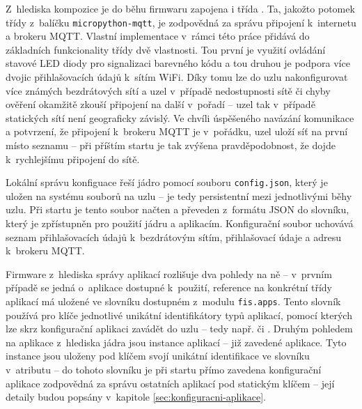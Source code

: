 Z~hlediska kompozice je do běhu firmwaru zapojena i třída . Ta, jakožto potomek třídy 
z~balíčku \texttt{micropython-mqtt}, je zodpovědná za správu připojení k~internetu a brokeru MQTT.
Vlastní implementace v~rámci této práce přidává do základních funkcionality třídy dvě vlastnosti.
Tou první je využití ovládání stavové LED diody pro signalizaci barevného kódu a tou druhou je podpora více dvojic
přihlašovacích údajů k~sítím WiFi. Díky tomu lze do uzlu nakonfigurovat více známých bezdrátových sítí a uzel
v~případě nedostupnosti sítě či chyby ověření okamžitě zkouší připojení na další v~pořadí -- uzel tak v~případě
statických sítí není geograficky závislý. Ve chvíli úspěšeného navázání komunikace a potvrzení, že připojení
k~brokeru MQTT je v~pořádku, uzel uloží síť na první místo seznamu -- při příštím startu je tak
zvýšena pravděpodobnost, že dojde k~rychlejšímu připojení do sítě.

Lokální správu konfiguace řeší jádro pomocí souboru \texttt{config.json}, který je uložen na
systému souborů na uzlu -- je tedy persistentní mezi jednotlivými běhy uzlu.
Při startu je tento soubor načten a převeden z~formátu JSON do slovníku, který je
zpřístupněn pro použití jádru a aplikacím. Konfigurační soubor uchovává seznam přihlašovacích údajů
k~bezdrátovým sítím, přihlašovací údaje a adresu k~brokeru MQTT.

Firmware z~hlediska správy aplikací rozlišuje dva pohledy na ně -- v~prvním případě se jedná o~aplikace dostupné
k~použití, reference na konkrétní třídy aplikací má uložené ve slovníku  dostupném z~modulu \texttt{fis.apps}.
Tento slovník používá pro klíče jednotlivé unikátní identifikátory typů aplikací, pomocí kterých lze skrz konfigurační
aplikaci zavádět do uzlu -- tedy např.  či .
Druhým pohledem na aplikace z~hlediska jádra jsou instance aplikací -- již zavedené aplikace. Tyto instance jsou
uloženy pod klíčem svojí unikátní identifikace ve slovníku v~atributu  -- do tohoto slovníku je při
startu přímo zavedena konfigurační aplikace zodpovědná za správu ostatních aplikací pod statickým klíčem 
-- její detaily budou popsány v~kapitole \ref{sec:konfiguracni-aplikace}.

